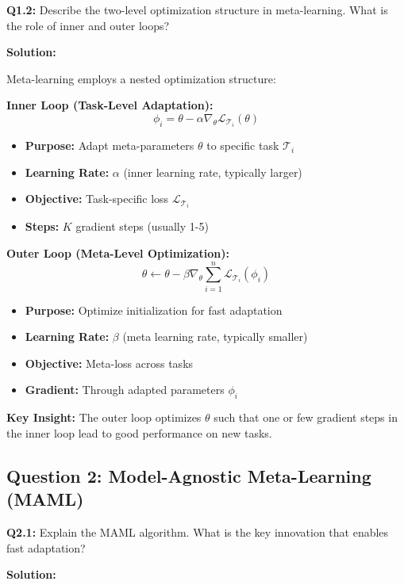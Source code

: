 \documentclass[12pt]{article}
\begin{document}
{{			\textbf{Q1.2:} Describe the two-level optimization structure in meta-learning. What is the role of inner and outer loops?
			
			\textbf{Solution:}
			
			Meta-learning employs a nested optimization structure:
			
			\textbf{Inner Loop (Task-Level Adaptation):}
			$$\phi_i = \theta - \alpha \nabla_\theta \mathcal{L}_{\mathcal{T}_i}(\theta)$$
			
			\begin{itemize}
				\item \textbf{Purpose:} Adapt meta-parameters $\theta$ to specific task $\mathcal{T}_i$
				\item \textbf{Learning Rate:} $\alpha$ (inner learning rate, typically larger)
				\item \textbf{Objective:} Task-specific loss $\mathcal{L}_{\mathcal{T}_i}$
				\item \textbf{Steps:} $K$ gradient steps (usually 1-5)
			\end{itemize}
			
			\textbf{Outer Loop (Meta-Level Optimization):}
			$$\theta \leftarrow \theta - \beta \nabla_\theta \sum_{i=1}^{n} \mathcal{L}_{\mathcal{T}_i}(\phi_i)$$
			
			\begin{itemize}
				\item \textbf{Purpose:} Optimize initialization for fast adaptation
				\item \textbf{Learning Rate:} $\beta$ (meta learning rate, typically smaller)
				\item \textbf{Objective:} Meta-loss across tasks
				\item \textbf{Gradient:} Through adapted parameters $\phi_i$
			\end{itemize}
			
			\textbf{Key Insight:} The outer loop optimizes $\theta$ such that one or few gradient steps in the inner loop lead to good performance on new tasks.
			
			\subsection{Question 2: Model-Agnostic Meta-Learning (MAML)}
			
			\textbf{Q2.1:} Explain the MAML algorithm. What is the key innovation that enables fast adaptation?
			
			\textbf{Solution:}
			
}}
\end{document}
